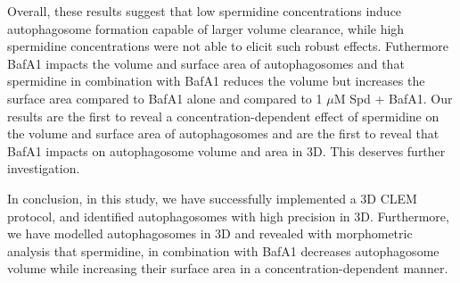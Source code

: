 Overall, these results suggest that low spermidine concentrations induce autophagosome formation capable of larger volume clearance, while high spermidine concentrations were not able to elicit such robust effects. Futhermore BafA1 impacts the volume and surface area of autophagosomes and that spermidine in combination with BafA1 reduces the volume but increases the surface area compared to BafA1 alone and compared to 1 $\mu$M Spd + BafA1. Our results are the first to reveal a concentration-dependent effect of spermidine on the volume and surface area of autophagosomes and are the first to reveal that BafA1 impacts on autophagosome volume and area in 3D. This  deserves further investigation.

In conclusion, in this study, we have successfully implemented a 3D CLEM protocol, and identified autophagosomes with high precision in 3D. Furthermore, we have modelled autophagosomes in 3D and revealed with morphometric analysis that spermidine, in combination with BafA1 decreases autophagosome volume while increasing their surface area in a concentration-dependent manner. 



























